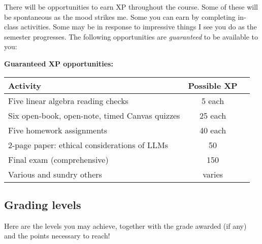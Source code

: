 \documentclass[12pt]{article}
\begin{document}
There will be opportunities to earn XP throughout the course. Some of these
will be spontaneous as the mood strikes me. Some you can earn by completing
in-class activities. Some may be in response to impressive things I see you
do as the semester progresses. The following opportunities are
\textit{guaranteed} to be available to you:

\begin{center}
\small
\textbf{Guaranteed XP opportunities:}\\
\begin{tabular}{|l | c | c|}
\hline
Activity & Possible XP \\
\hline
\hline
Five linear algebra reading checks     & 5 each  \\
\hline
Six open-book, open-note, timed Canvas quizzes     & 25 each  \\
\hline
Five homework assignments     & 40 each  \\
\hline
2-page paper: ethical considerations of LLMs       & 50 \\
\hline
Final exam (comprehensive)    & 150 \\
\hline
Various and sundry others     & varies \\ 
\hline
\end{tabular}
\end{center}

\subsection*{Grading levels}
Here are the levels you may achieve, together with the grade awarded (if any)
and the points necessary to reach!
\end{document}
